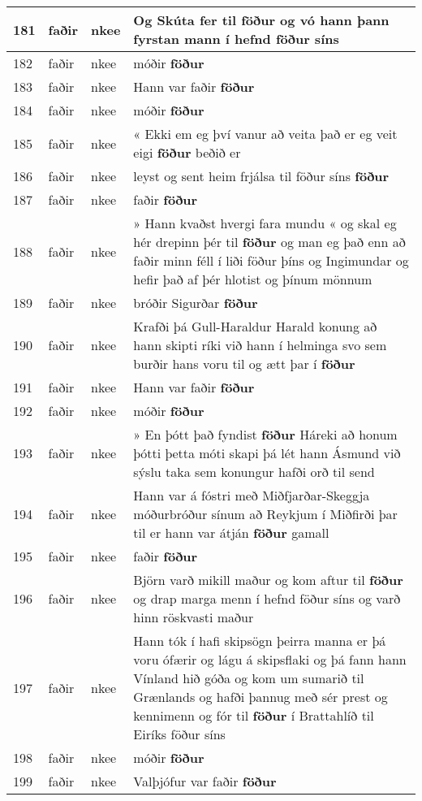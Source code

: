 \documentclass{article}
\begin{document}
\begin{longtable}{p{1cm}|p{1cm}|p{1cm}|p{13cm}}
\hline
181&faðir&nkee&Og Skúta fer til \textbf{föður} og vó hann þann fyrstan mann í hefnd föður síns\\
\hline
182&faðir&nkee&móðir \textbf{föður} \\
\hline
183&faðir&nkee&Hann var faðir \textbf{föður} \\
\hline
184&faðir&nkee&móðir \textbf{föður} \\
\hline
185&faðir&nkee&« Ekki em eg því vanur að veita það er eg veit eigi \textbf{föður} beðið er\\
\hline
186&faðir&nkee&leyst og sent heim frjálsa til föður síns \textbf{föður} \\
\hline
187&faðir&nkee&faðir \textbf{föður} \\
\hline
188&faðir&nkee&» Hann kvaðst hvergi fara mundu « og skal eg hér drepinn þér til \textbf{föður} og man eg það enn að faðir minn féll í liði föður þíns og Ingimundar og hefir það af þér hlotist og þínum mönnum\\
\hline
189&faðir&nkee&bróðir Sigurðar \textbf{föður} \\
\hline
190&faðir&nkee&Krafði þá Gull-Haraldur Harald konung að hann skipti ríki við hann í helminga svo sem burðir hans voru til og ætt þar í \textbf{föður} \\
\hline
191&faðir&nkee&Hann var faðir \textbf{föður} \\
\hline
192&faðir&nkee&móðir \textbf{föður} \\
\hline
193&faðir&nkee&» En þótt það fyndist \textbf{föður} Háreki að honum þótti þetta móti skapi þá lét hann Ásmund við sýslu taka sem konungur hafði orð til send\\
\hline
194&faðir&nkee&Hann var á fóstri með Miðfjarðar-Skeggja móðurbróður sínum að Reykjum í Miðfirði þar til er hann var átján \textbf{föður} gamall\\
\hline
195&faðir&nkee&faðir \textbf{föður} \\
\hline
196&faðir&nkee&Björn varð mikill maður og kom aftur til \textbf{föður} og drap marga menn í hefnd föður síns og varð hinn röskvasti maður\\
\hline
197&faðir&nkee&Hann tók í hafi skipsögn þeirra manna er þá voru ófærir og lágu á skipsflaki og þá fann hann Vínland hið góða og kom um sumarið til Grænlands og hafði þannug með sér prest og kennimenn og fór til \textbf{föður} í Brattahlíð til Eiríks föður síns\\
\hline
198&faðir&nkee&móðir \textbf{föður} \\
\hline
199&faðir&nkee&Valþjófur var faðir \textbf{föður} \\

\end{longtable}
\end{document}
